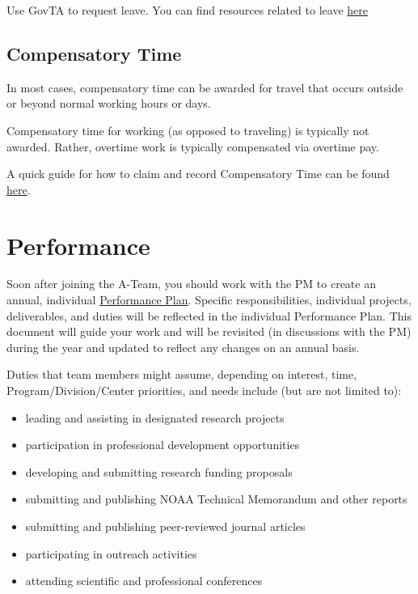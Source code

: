 \documentclass[
  letterpaper,
  DIV=11,
  numbers=noendperiod]{scrreprt}
\providecommand{\tightlist}{%
  \setlength{\itemsep}{0pt}\setlength{\parskip}{0pt}}\usepackage{longtable,booktabs,array}
\begin{document}
Use GovTA to request leave. You can find resources related to leave
\href{https://sites.google.com/noaa.gov/myafsc/administrative/time-and-attendance}{here}

\hypertarget{compensatory-time}{%
\subsection{Compensatory Time}\label{compensatory-time}}

In most cases, compensatory time can be awarded for travel that occurs
outside or beyond normal working hours or days.

Compensatory time for working (as opposed to traveling) is typically not
awarded. Rather, overtime work is typically compensated via overtime
pay.

A quick guide for how to claim and record Compensatory Time can be found
\href{https://docs.google.com/document/d/1BdvL0mbBE0JY5HkDjdoi5RhCc0rn3G0SfXFHeo03nzY/edit}{here}.

\hypertarget{sec-perf}{%
\section{Performance}\label{sec-perf}}

Soon after joining the A-Team, you should work with the PM to create an
annual, individual
\href{https://drive.google.com/file/d/18veCUTjncQVhRY6jOou9kclKWXJssOca/view?pli=1}{Performance
Plan}. Specific responsibilities, individual projects, deliverables, and
duties will be reflected in the individual Performance Plan. This
document will guide your work and will be revisited (in discussions with
the PM) during the year and updated to reflect any changes on an annual
basis.

Duties that team members might assume, depending on interest, time,
Program/Division/Center priorities, and needs include (but are not
limited to):

\begin{itemize}
\tightlist
\item
  leading and assisting in designated research projects\\
\item
  participation in professional development opportunities\\
\item
  developing and submitting research funding proposals\\
\item
  submitting and publishing NOAA Technical Memorandum and other
  reports\\
\item
  submitting and publishing peer-reviewed journal articles
\item
  participating in outreach activities\\
\item
  attending scientific and professional conferences
\end{itemize}
\end{document}
